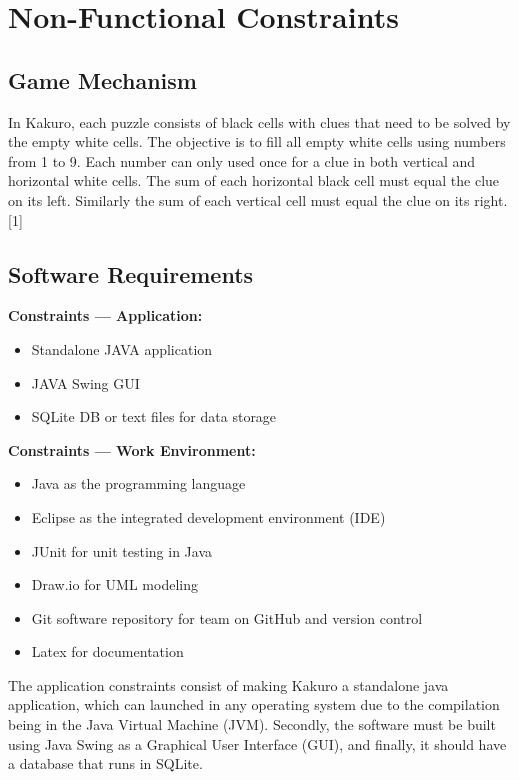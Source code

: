 \documentclass[12pt]{article}
\begin{document}
\newpage

\section{Non-Functional Constraints}

\subsection{Game Mechanism}

In Kakuro, each puzzle consists of black cells with clues that need to be solved by the empty white cells. The objective is to fill all empty white cells using numbers from 1 to 9. Each number can only used once for a clue in both vertical and horizontal white cells. The sum of each horizontal black cell must equal the clue on its left. Similarly the sum of each vertical cell must equal the clue on its right. [1]

\subsection{Software Requirements}
\textbf{Constraints — Application:}
\begin{itemize}
   \item Standalone JAVA application
   \item JAVA Swing GUI
   \item SQLite DB or text files for data storage 
\end{itemize}

\textbf{Constraints — Work Environment:}
\begin{itemize}
   \item Java as the programming language
   \item Eclipse as the integrated development environment (IDE)
   \item JUnit for unit testing in Java
   \item Draw.io for UML modeling
   \item Git software repository for team on GitHub and version control
   \item Latex for documentation
\end{itemize}

\vspace{5mm}

The application constraints consist of making Kakuro a standalone java application, which can launched in any operating system due to the compilation being in the Java Virtual Machine (JVM). Secondly, the software must be built using Java Swing as a Graphical User Interface (GUI), and finally, it should have a database that runs in SQLite.
\end{document}
